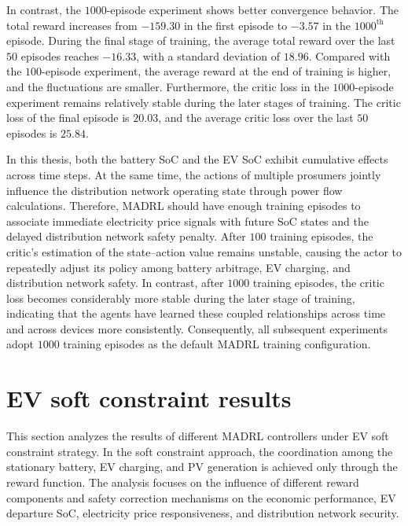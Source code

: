 In contrast, the \(1000\)-episode experiment shows better convergence behavior. The total reward increases from \(-159.30\) in the first episode to \(-3.57\) in the \(1000^{\mathrm{th}}\) episode. During the final stage of training, the average total reward over the last \(50\) episodes reaches \(-16.33\), with a standard deviation of \(18.96\). Compared with the \(100\)-episode experiment, the average reward at the end of training is higher, and the fluctuations are smaller. Furthermore, the critic loss in the \(1000\)-episode experiment remains relatively stable during the later stages of training. The critic loss of the final episode is \(20.03\), and the average critic loss over the last \(50\) episodes is \(25.84\). 

In this thesis, both the battery SoC and the EV SoC exhibit cumulative effects across time steps. At the same time, the actions of multiple prosumers jointly influence the distribution network operating state through power flow calculations. Therefore, MADRL should have enough training episodes to associate immediate electricity price signals with future SoC states and the delayed distribution network safety penalty. After \(100\) training episodes, the critic's estimation of the state--action value remains unstable, causing the actor to repeatedly adjust its policy among battery arbitrage, EV charging, and distribution network safety. In contrast, after \(1000\) training episodes, the critic loss becomes considerably more stable during the later stage of training, indicating that the agents have learned these coupled relationships across time and across devices more consistently. Consequently, all subsequent experiments adopt \(1000\) training episodes as the default MADRL training configuration.

\section{EV soft constraint results}\label{section:madrlsoft-results}

This section analyzes the results of different MADRL controllers under EV soft constraint strategy. In the soft constraint approach, the coordination among the stationary battery, EV charging, and PV generation is achieved only through the reward function. The analysis focuses on the influence of different reward components and safety correction mechanisms on the economic performance, EV departure SoC, electricity price responsiveness, and distribution network security.

